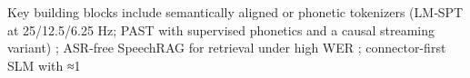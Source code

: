 \documentclass{article}
\begin{document}
Key building blocks include semantically aligned or phonetic tokenizers (LM‑SPT at 25/12.5/6.25 Hz; PAST with supervised phonetics and a causal streaming variant) \cite{jo2025lmsptalignedsemanticdistillationspeechto,har-tuv2025pastphoneticacousticspeechtokenizer}; ASR‑free SpeechRAG for retrieval under high WER \cite{min2025speechretrievalaugmentedgenerationwithou}; connector-first SLM with ≈1%
\end{document}
